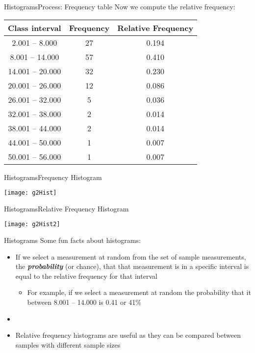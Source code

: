 \documentclass[xcolor=dvipsnames]{beamer}
\begin{document}
\begin{frame}{Histograms}{Process: Frequency table}
	Now we compute the relative frequency:
	\begin{center}
		\begin{tabular}{|c|c|c|}
			\hline
			\textbf{Class interval} & \textbf{Frequency} & \textbf{Relative Frequency} \\
			\hline \hline
			2.001 -- 8.000 & 27 & 0.194 \\ \hline 
			8.001 -- 14.000 & 57 & 0.410\\ \hline 
			14.001 -- 20.000 & 32 & 0.230\\ \hline 
			20.001 -- 26.000 & 12 & 0.086\\ \hline 
			26.001 -- 32.000 & 5 & 0.036\\ \hline 
			32.001 -- 38.000 & 2& 0.014\\ \hline 
			38.001 -- 44.000 & 2 & 0.014\\ \hline 
			44.001 -- 50.000 & 1& 0.007\\ \hline 
			50.001 -- 56.000 & 1& 0.007\\ \hline 
		\end{tabular}
	\end{center}
\end{frame}

\begin{frame}{Histograms}{Frequency Histogram}
\begin{center}
	\texttt{[image: g2Hist]}
\end{center}
\end{frame}

\begin{frame}{Histograms}{Relative Frequency Histogram}
	\begin{center}
		\texttt{[image: g2Hist2]}
	\end{center}
\end{frame}

\begin{frame}{Histograms}
Some fun facts about histograms:
	\begin{itemize}
		\item If we select a measurement at random from the set of sample measurements, the \textbf{\emph{probability}} (or chance), that that measurement is in a specific interval is equal to the relative frequency for that interval
		\begin{itemize}
			\item For example, if we select a measurement at random the probability that it between 8.001 -- 14.000 is 0.41 or 41\%
		\end{itemize}
		\item[]
		\item Relative frequency histograms are useful as they can be compared between samples with different sample sizes
	\end{itemize}
\end{frame}
\end{document}
